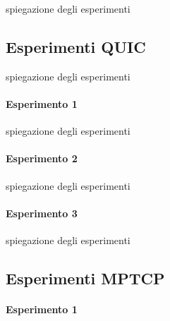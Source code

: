 spiegazione degli esperimenti

\subsection{Esperimenti QUIC}

spiegazione degli esperimenti

\paragraph{Esperimento 1}
spiegazione degli esperimenti
\paragraph{Esperimento 2}
spiegazione degli esperimenti
\paragraph{Esperimento 3}
spiegazione degli esperimenti

\subsection{Esperimenti MPTCP}
\paragraph{Esperimento 1}

